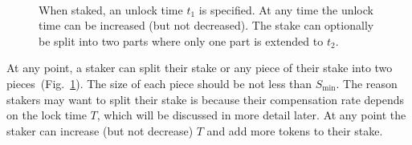 \documentclass[longbibliography,nofootinbib,twocolumn]{revtex4-1}
\newcommand{\figref}[1]{Fig.~\ref{#1}}
\begin{document}
\begin{figure}
    \\
    \caption{
        When staked, an unlock time $t_1$ is specified.
        At any time the unlock time can be increased (but not decreased).
        The stake can optionally be split into two parts where only one part is extended to $t_2$.
    }
    \label{fig:mining-modes}
\end{figure}

At any point, a staker can split their stake or any piece of their stake into two pieces~(\figref{fig:mining-modes}).
The size of each piece should be not less than $S_{\min}$.
The reason stakers may want to split their stake is because their compensation rate depends on the lock time $T$,
which will be discussed in more detail later.
At any point the staker can increase (but not decrease) $T$ and add more tokens to their stake.
\end{document}
